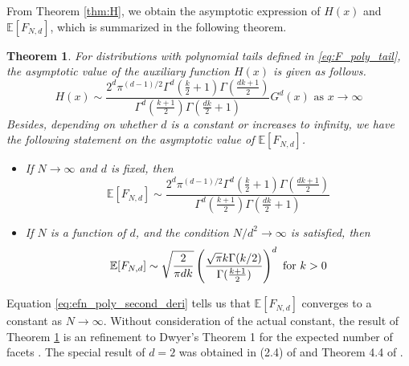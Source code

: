 \documentclass[conference,a4paper]{IEEEtran}
\def\E{\mathbb{E}}
\newtheorem{theorem}{Theorem}
\begin{document}
From Theorem \ref{thm:H}, we obtain the asymptotic
expression of $H(x)$ and $\E[F_{N,d}]$, which is
summarized in the following theorem.
\begin{theorem}\label{thm:poly_tails}
     For distributions with polynomial tails defined in \eqref{eq:F_poly_tail},
     the asymptotic value of the auxiliary function $H(x)$ is given as follows.
     \begin{equation}\label{eq:H_poly_tail_exp}
          H(x) \sim \frac{2^d \pi^{(d-1)/2}\Gamma^d(\frac{k}{2}+1)
          \Gamma(\frac{dk+1}{2})}{
              \Gamma^d(\frac{k+1}{2}) \Gamma(\frac{dk}{2}+1)} G^d (x)
              \textrm{ as } x\to \infty
     \end{equation}
     Besides, depending on whether $d$ is a constant or increases to infinity,
     we have the following statement on
     the asymptotic value of $\E[F_{N,d}]$.
     \begin{itemize}
          \item If $N \to \infty$ and $d$ is fixed, then
     \begin{equation}\label{eq:efn_poly_second_deri}
    \E[F_{N,d}] \sim \frac{2^d \pi^{(d-1)/2}\Gamma^d(\frac{k}{2}+1)
    \Gamma(\frac{dk+1}{2})}{
        \Gamma^d(\frac{k+1}{2}) \Gamma(\frac{dk}{2}+1)}
     \end{equation}
\item
If $N$ is a function of $d$, and the condition $N/d^2 \to \infty$ is satisfied, then
\begin{equation}\label{eq:poly_E_F_{N,d}_d_infty}
\E[F_{N,d}] \sim \sqrt{\frac{2}{\pi dk}}\left(
      \frac{\sqrt{\pi}k \Gamma(k/2)}
     {\Gamma(\frac{k+1}{2})}
 \right)^d \textrm{ for } k>0
\end{equation}
\end{itemize}
\end{theorem}
Equation \eqref{eq:efn_poly_second_deri} tells
us that $\E[F_{N,d}]$ converges to a constant as $N \to \infty$.
Without consideration of the actual constant, the result of
Theorem \ref{thm:poly_tails} is an refinement to Dwyer's Theorem 1 for the expected number of facets \cite{dwyer1991convex}.
The special result of $d=2$ was obtained in (2.4) of \cite{carnal1970konvexe}
and Theorem 4.4 of \cite{davis1987convex}.
\end{document}
